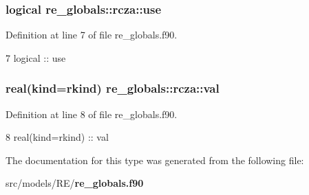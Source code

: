 \subsubsection[{use}]{\setlength{\rightskip}{0pt plus 5cm}logical re\+\_\+globals\+::rcza\+::use}\label{structre__globals_1_1rcza_a99d0f081b3a79664b992987b446331f8}


Definition at line 7 of file re\+\_\+globals.\+f90.


\begin{DoxyCode}
7     \textcolor{keywordtype}{logical}                                         :: use
\end{DoxyCode}
\subsubsection[{val}]{\setlength{\rightskip}{0pt plus 5cm}real(kind=rkind) re\+\_\+globals\+::rcza\+::val}\label{structre__globals_1_1rcza_a70705fabbe510aee6218336d5cd2dec4}


Definition at line 8 of file re\+\_\+globals.\+f90.


\begin{DoxyCode}
8     \textcolor{keywordtype}{real(kind=rkind)}                                :: val
\end{DoxyCode}


The documentation for this type was generated from the following file\+:\begin{DoxyCompactItemize}
\item 
src/models/\+R\+E/{\bf re\+\_\+globals.\+f90}\end{DoxyCompactItemize}
